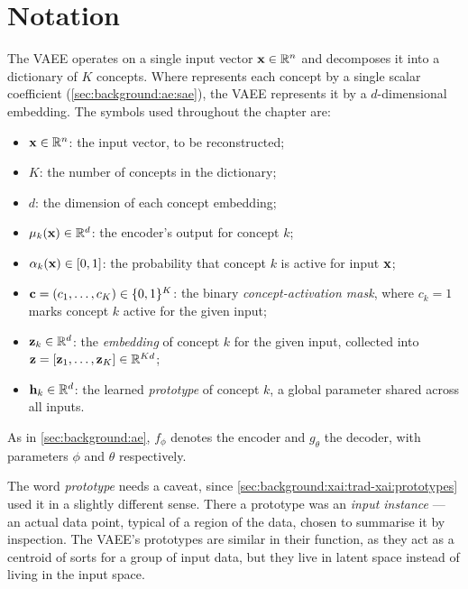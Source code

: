 
\section{Notation} \label{sec:methods:notation}

The \ac{VAEE} operates on a single input vector $\vb{x} \in \mathbb{R}^{n}$ and
decomposes it into a dictionary of $K$ concepts. Where  represents each
concept by a single scalar coefficient
(\cref{sec:background:ae:sae}), the
\ac{VAEE} represents it by a $d$-dimensional embedding. The symbols used
throughout the chapter are:
\begin{itemize}
    \item $\vb{x} \in \mathbb{R}^{n}$: the input vector, to be reconstructed;
    \item $K$: the number of concepts in the dictionary;
    \item $d$: the dimension of each concept embedding;
    \item $\vb{\mu}_k(\vb{x}) \in \mathbb{R}^{d}$: the encoder's output for concept $k$;
    \item $\alpha_k(\vb{x}) \in [0,1]$: the probability that concept $k$ is
        active for input $\vb{x}$;
    \item $\vb{c} = (c_1, \dots, c_K) \in \{0,1\}^{K}$: the binary
        \textit{concept-activation mask}, where $c_k = 1$ marks concept $k$
        active for the given input;
    \item $\vb{z}_k \in \mathbb{R}^{d}$: the \textit{embedding} of concept $k$ for the
        given input, collected into
        $\vb{z} = [\vb{z}_1, \dots, \vb{z}_K] \in \mathbb{R}^{Kd}$;
    \item $\vb{h}_k \in \mathbb{R}^{d}$: the learned \textit{prototype} of concept $k$,
        a global parameter shared across all inputs.
\end{itemize}
As in \cref{sec:background:ae}, $f_{\phi}$ denotes
the encoder and $g_{\theta}$ the decoder, with parameters $\phi$ and $\theta$
respectively.

The word \textit{prototype} needs a caveat, since
\cref{sec:background:xai:trad-xai:prototypes}
used it in a slightly different sense. There a prototype was an \textit{input
instance} --- an actual data point, typical of a region of the data, chosen to
summarise it by inspection. The \ac{VAEE}'s prototypes are similar in their
function, as they act as a centroid of sorts for a group of input data, but they
live in latent space instead of living in the input space.

